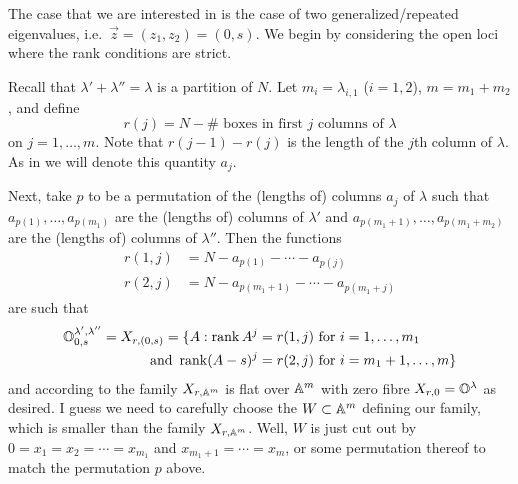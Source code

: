 \documentclass[draft]{article}
\begin{document}
The case that we are interested in is the case of two generalized/repeated eigenvalues, i.e.\ $\vec z = (z_1,z_2) = (0,s)$.  
We begin by considering the open loci where the rank conditions are strict. 

Recall that $\lambda' + \lambda'' = \lambda$ is a partition of $N$. 
Let $m_i = \lambda_{i,1}$ ($i = 1,2$), $m = m_1 + m_2$, and define
$$r(j) = N - \#\text{~boxes in first $j$ columns of }\lambda$$
on $j = 1,\dots,m$. Note that $r(j-1) - r(j)$ is the length of the $j$th column of $\lambda$. As in \cite{eisenbud1989rank} we will denote this quantity $a_j$. 
% 

Next, take $p$ to be a permutation of the (lengths of) columns $a_j$ of $\lambda$ such that $a_{p(1)},\dots,a_{p(m_1)}$ are the (lengths of) columns of $\lambda'$ and $a_{p(m_1 + 1)},\dots, a_{p(m_1 + m_2)}$ are the (lengths of) columns of $\lambda''$. 
Then the functions 
$$
\begin{aligned}
r(1,j) &= N - a_{p(1)} - \cdots - a_{p(j)} \\
r(2,j) &= N - a_{p(m_1 + 1)} - \cdots - a_{p(m_1 + j)}
\end{aligned}
$$
are such that 
\begin{align*}
    \OO^{\lambda',\lambda''}_{0,s} = X_{r,(0,s)} = \{A:\rk A^j &= r(1,j) \text{ for } i = 1,\dots, m_1 \\ \text{ and } \rk (A-s)^j &= r(2,j) \text{ for } i = m_1 + 1 ,\dots, m \}
\end{align*}
and according to \cite[Theorem 2.1(iii)]{eisenbud1989rank} the family $X_{r,\AA^m}$ is flat over $\AA^m$ with zero fibre $X_{r,0} = \OO^\lambda$ as desired. I guess we need to carefully choose the $W \subset \AA^m$ defining our family, which is smaller than the family $X_{r,\AA^m}$. Well, $W$ is just cut out by $0 = x_1 = x_2 = \cdots = x_{m_1}$ and $ x_{m_1 + 1} = \cdots = x_m$, or some permutation thereof to match the permutation $p$ above.
 
\end{document}
